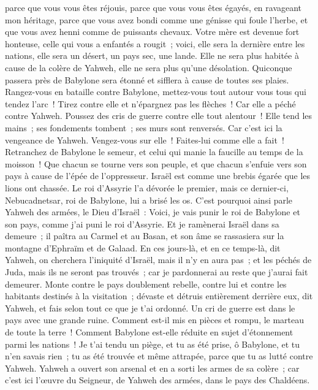 \begin{multicols}{2}
parce que vous vous êtes réjouis, parce que vous vous êtes égayés, en ravageant mon héritage, parce que vous avez bondi comme une génisse qui foule l'herbe, et que vous avez henni comme de puissants chevaux.
Votre mère est devenue fort honteuse, celle qui vous a enfantés a rougit~; voici, elle sera la dernière entre les nations, elle sera un désert, un pays sec, une lande.
Elle ne sera plus habitée à cause de la colère de Yahweh, elle ne sera plus qu'une désolation. Quiconque passera près de Babylone sera étonné et sifflera à cause de toutes ses plaies.
Rangez-vous en bataille contre Babylone, mettez-vous tout autour vous tous qui tendez l'arc~! Tirez contre elle et n'épargnez pas les flèches~! Car elle a péché contre Yahweh.
Poussez des cris de guerre contre elle tout alentour~! Elle tend les mains~; ses fondements tombent~; ses murs sont renversés. Car c'est ici la vengeance de Yahweh. Vengez-vous sur elle~! Faites-lui comme elle a fait~!
Retranchez de Babylone le semeur, et celui qui manie la faucille au temps de la moisson~! Que chacun se tourne vers son peuple, et que chacun s'enfuie vers son pays à cause de l'épée de l'oppresseur.
Israël est comme une brebis égarée que les lions ont chassée. Le roi d'Assyrie l'a dévorée le premier, mais ce dernier-ci, Nebucadnetsar, roi de Babylone, lui a brisé les os.
C'est pourquoi ainsi parle Yahweh des armées, le Dieu d'Israël~: Voici, je vais punir le roi de Babylone et son pays, comme j'ai puni le roi d'Assyrie.
Et je ramènerai Israël dans sa demeure~; il paîtra au Carmel et au Basan, et son âme se rassasiera sur la montagne d'Ephraïm et de Galaad.
En ces jours-là, et en ce temps-là, dit Yahweh, on cherchera l'iniquité d'Israël, mais il n'y en aura pas~; et les péchés de Juda, mais ils ne seront pas trouvés~; car je pardonnerai au reste que j'aurai fait demeurer.
Monte contre le pays doublement rebelle, contre lui et contre les habitants destinés à la visitation~; dévaste et détruis entièrement derrière eux, dit Yahweh, et fais selon tout ce que je t'ai ordonné.
Un cri de guerre est dans le pays avec une grande ruine.
Comment est-il mis en pièces et rompu, le marteau de toute la terre~! Comment Babylone est-elle réduite en sujet d'étonnement parmi les nations~! 
Je t'ai tendu un piège, et tu as été prise, ô Babylone, et tu n'en savais rien~; tu as été trouvée et même attrapée, parce que tu as lutté contre Yahweh.
Yahweh a ouvert son arsenal et en a sorti les armes de sa colère~; car c'est ici l'œuvre du Seigneur, de Yahweh des armées, dans le pays des Chaldéens.

\end{multicols}
